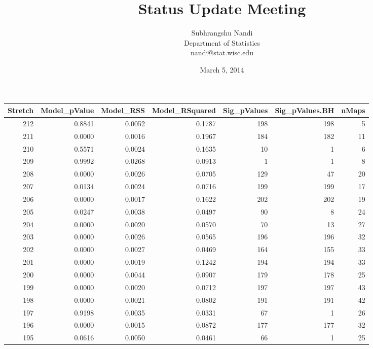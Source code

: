 \documentclass[11pt]{article}
\begin{document}


\title{Status Update Meeting}
\author{Subhrangshu Nandi\\
  Department of Statistics\\
  nandi@stat.wisc.edu}
\date{March 5, 2014}
\maketitle

\begin{landscape}
\begin{table}[ht]
\centering
\begin{tabular}{rrrrrrr}
  \hline
Stretch & Model\_pValue & Model\_RSS & Model\_RSquared & Sig\_pValues & Sig\_pValues.BH & nMaps \\ 
  \hline
212 & 0.8841 & 0.0052 & 0.1787 & 198 & 198 & 5 \\ 
  211 & 0.0000 & 0.0016 & 0.1967 & 184 & 182 & 11 \\ 
  210 & 0.5571 & 0.0024 & 0.1635 & 10 & 1 & 6 \\ 
  209 & 0.9992 & 0.0268 & 0.0913 & 1 & 1 & 8 \\ 
  208 & 0.0000 & 0.0026 & 0.0705 & 129 & 47 & 20 \\ 
  207 & 0.0134 & 0.0024 & 0.0716 & 199 & 199 & 17 \\ 
  206 & 0.0000 & 0.0017 & 0.1622 & 202 & 202 & 19 \\ 
  205 & 0.0247 & 0.0038 & 0.0497 & 90 & 8 & 24 \\ 
  204 & 0.0000 & 0.0020 & 0.0570 & 70 & 13 & 27 \\ 
  203 & 0.0000 & 0.0026 & 0.0565 & 196 & 196 & 32 \\ 
  202 & 0.0000 & 0.0027 & 0.0469 & 164 & 155 & 33 \\ 
  201 & 0.0000 & 0.0019 & 0.1242 & 194 & 194 & 33 \\ 
  200 & 0.0000 & 0.0044 & 0.0907 & 179 & 178 & 25 \\ 
  199 & 0.0000 & 0.0020 & 0.0712 & 197 & 197 & 43 \\ 
  198 & 0.0000 & 0.0021 & 0.0802 & 191 & 191 & 42 \\ 
  197 & 0.9198 & 0.0035 & 0.0331 & 67 & 1 & 26 \\ 
  196 & 0.0000 & 0.0015 & 0.0872 & 177 & 177 & 32 \\ 
  195 & 0.0616 & 0.0050 & 0.0461 & 66 & 1 & 25 \\ 

\end{tabular}
\end{table}
\end{landscape}
\end{document}
